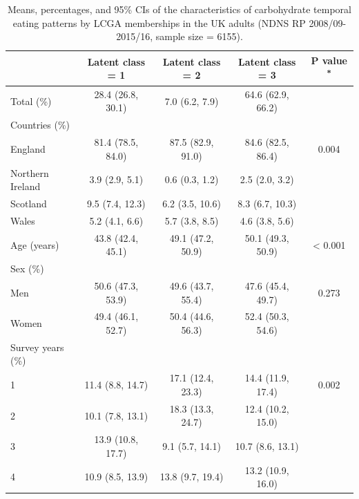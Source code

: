 \begin{table}
	
	\caption{\label{tab:LCGAtab1}Means, percentages, and 95\% CIs of the characteristics of carbohydrate temporal eating patterns by LCGA memberships in the UK adults (NDNS RP 2008/09-2015/16, sample size = 6155).}\vspace{-0.3cm}
	\centering
	\fontsize{9}{11}\selectfont
	\begin{tabular}[t]{lcccc}
		\hiderowcolors
		\toprule
		 & Latent class = 1 & Latent class = 2 & Latent class = 3 & P value \textsuperscript{*}\\
		\midrule
		\showrowcolors
		Total (\%) & 28.4 (26.8, 30.1) & 7.0 (6.2, 7.9) & 64.6 (62.9, 66.2) & \\
		Countries (\%) &  &  &  & \\
		\hspace{1em}England & 81.4 (78.5, 84.0) & 87.5 (82.9, 91.0) & 84.6 (82.5, 86.4) & 0.004\\
		\hspace{1em}Northern Ireland & 3.9 (2.9, 5.1) & 0.6 (0.3, 1.2) & 2.5 (2.0, 3.2) & \\
		\hspace{1em}Scotland & 9.5 (7.4, 12.3) & 6.2 (3.5, 10.6) & 8.3 (6.7, 10.3) & \\
		\hspace{1em}Wales & 5.2 (4.1, 6.6) & 5.7 (3.8, 8.5) & 4.6 (3.8, 5.6) & \\
		Age (years) & 43.8 (42.4, 45.1) & 49.1 (47.2, 50.9) & 50.1 (49.3, 50.9) & < 0.001\\
		Sex (\%) &  &  &  & \\
		\hspace{1em}Men & 50.6 (47.3, 53.9) & 49.6 (43.7, 55.4) & 47.6 (45.4, 49.7) & 0.273\\
		\hspace{1em}Women & 49.4 (46.1, 52.7) & 50.4 (44.6, 56.3) & 52.4 (50.3, 54.6) & \\
		Survey years (\%) &  &  &  & \\
		\hspace{1em}1 & 11.4 (8.8, 14.7) & 17.1 (12.4, 23.3) & 14.4 (11.9, 17.4) & 0.002\\
		\hspace{1em}2 & 10.1 (7.8, 13.1) & 18.3 (13.3, 24.7) & 12.4 (10.2, 15.0) & \\
		\hspace{1em}3 & 13.9 (10.8, 17.7) & 9.1 (5.7, 14.1) & 10.7 (8.6, 13.1) & \\
		\hspace{1em}4 & 10.9 (8.5, 13.9) & 13.8 (9.7, 19.4) & 13.2 (10.9, 16.0) & \\

\end{tabular}
\end{table}
